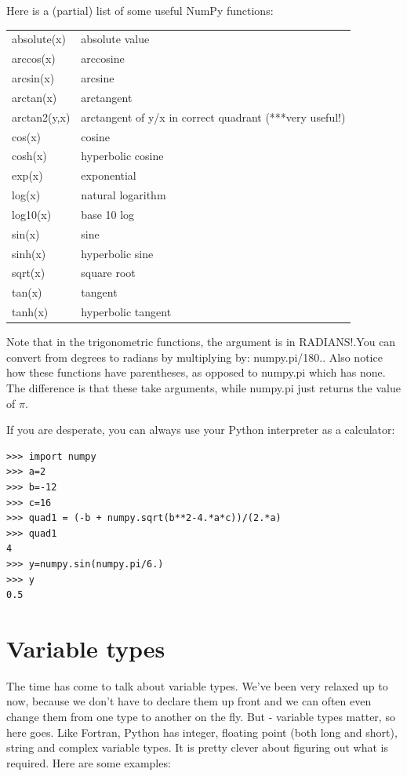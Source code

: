 \documentclass[11pt]{book}
\begin{document}
Here is a (partial) list of some useful {\color{blue}NumPy} functions:


\begin{tabular}{ll}
\hline
absolute(x)  & absolute value\\
arccos(x)    & arccosine\\
arcsin(x)    & arcsine\\
arctan(x)    & arctangent\\
arctan2(y,x)  &arctangent of y/x in correct quadrant (***very useful!)\\
cos(x)        &cosine\\
cosh(x)      & hyperbolic cosine\\
exp(x)      &  exponential\\
log(x)      &  natural logarithm\\
log10(x)    &  base 10 log\\
sin(x)       & sine\\
sinh(x)     &  hyperbolic sine\\
sqrt(x)    &   square root\\
tan(x)      &  tangent\\
tanh(x)    &   hyperbolic tangent\\
\hline
\end{tabular}

\noindent 
Note that  in the trigonometric functions,  the argument is in RADIANS!.You can convert from degrees to radians by multiplying by:  {\color{blue}numpy.pi/180.}.  Also notice how these functions have parentheses, as opposed to {\color{blue}numpy.pi} which has none.  The difference is that these take arguments, while  {\color{blue}numpy.pi} just returns the value of $\pi$.  


\noindent 
If you are desperate, you can always use your Python interpreter as a calculator:

{ \color{blue} \begin{verbatim}
>>> import numpy
>>> a=2
>>> b=-12
>>> c=16
>>> quad1 = (-b + numpy.sqrt(b**2-4.*a*c))/(2.*a)
>>> quad1
4
>>> y=numpy.sin(numpy.pi/6.)
>>> y
0.5
\end{verbatim}}


\section{Variable types}

The time has come to talk about variable types.  We've been very relaxed up to now, because we don't have to declare them up front and we can often even change them from one type to another on the fly.  But - variable types matter, so here goes.  Like Fortran, Python has integer, floating point (both long and short), string and complex variable types.  It is pretty clever about figuring out what is required.   Here are some examples:
\end{document}
